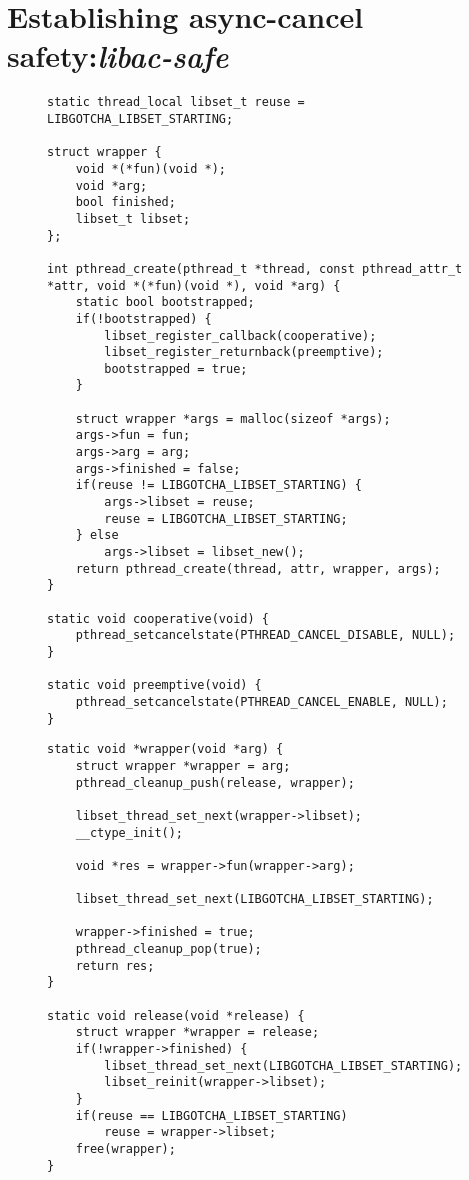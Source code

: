 

\section{Establishing async-cancel safety:\@ \textit{libac-safe}}

\begin{figure}
\begin{lstlisting}[label=lst:acsafe_gotchas,caption=\textit{libac-safe}'s \texttt{pthread\_create()} replacement and control library callbacks]
static thread_local libset_t reuse = LIBGOTCHA_LIBSET_STARTING;

struct wrapper {
	void *(*fun)(void *);
	void *arg;
	bool finished;
	libset_t libset;
};

int pthread_create(pthread_t *thread, const pthread_attr_t *attr, void *(*fun)(void *), void *arg) {
	static bool bootstrapped;
	if(!bootstrapped) {
		libset_register_callback(cooperative);
		libset_register_returnback(preemptive);
		bootstrapped = true;
	}

	struct wrapper *args = malloc(sizeof *args);
	args->fun = fun;
	args->arg = arg;
	args->finished = false;
	if(reuse != LIBGOTCHA_LIBSET_STARTING) {
		args->libset = reuse;
		reuse = LIBGOTCHA_LIBSET_STARTING;
	} else
		args->libset = libset_new();
	return pthread_create(thread, attr, wrapper, args);
}

static void cooperative(void) {
	pthread_setcancelstate(PTHREAD_CANCEL_DISABLE, NULL);
}

static void preemptive(void) {
	pthread_setcancelstate(PTHREAD_CANCEL_ENABLE, NULL);
}
\end{lstlisting}
\end{figure}

\begin{figure}
\begin{lstlisting}[label=lst:acsafe_helpers,caption=\textit{libac-safe}'s thread initializer and cleanup handler]
static void *wrapper(void *arg) {
	struct wrapper *wrapper = arg;
	pthread_cleanup_push(release, wrapper);

	libset_thread_set_next(wrapper->libset);
	__ctype_init();

	void *res = wrapper->fun(wrapper->arg);

	libset_thread_set_next(LIBGOTCHA_LIBSET_STARTING);

	wrapper->finished = true;
	pthread_cleanup_pop(true);
	return res;
}

static void release(void *release) {
	struct wrapper *wrapper = release;
	if(!wrapper->finished) {
		libset_thread_set_next(LIBGOTCHA_LIBSET_STARTING);
		libset_reinit(wrapper->libset);
	}
	if(reuse == LIBGOTCHA_LIBSET_STARTING)
		reuse = wrapper->libset;
	free(wrapper);
}
\end{lstlisting}
\end{figure}
